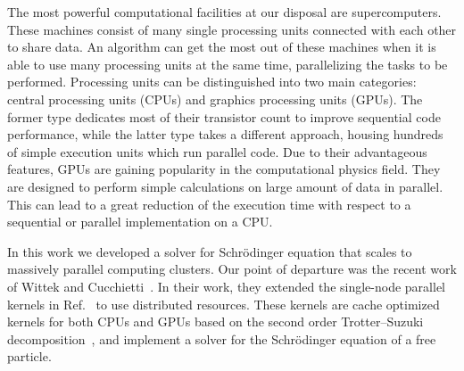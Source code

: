 The most powerful computational facilities at our disposal are supercomputers. These machines consist of many single processing units connected with each other to share data. An algorithm can get the most out of these machines when it is able to use many processing units at the same time, parallelizing the tasks to be performed. Processing units can be distinguished into two main categories: central processing units (CPUs) and graphics processing units (GPUs). The former type dedicates most of their transistor count to improve sequential code performance, while the latter type takes a different approach, housing hundreds of simple execution units which run parallel code. Due to their advantageous features, GPUs are gaining popularity in the computational physics field. They are designed to perform simple calculations on large amount of data in parallel. This can lead to a great reduction of the execution time with respect to a sequential or parallel implementation on a CPU.


In this work we developed a solver for Schr\"odinger equation that scales to	massively parallel computing clusters. Our point of departure was the recent work of Wittek and Cucchietti~\citep{Wittek20131165}. In their work, they extended the single-node parallel kernels in Ref.~\citep{bederian2011boosting} to use distributed resources. These kernels are cache optimized kernels for both CPUs and GPUs based on the second order Trotter--Suzuki decomposition~\citep{Suzuki1992387}, and implement a solver for the Schr\"odinger equation of a free particle. 

